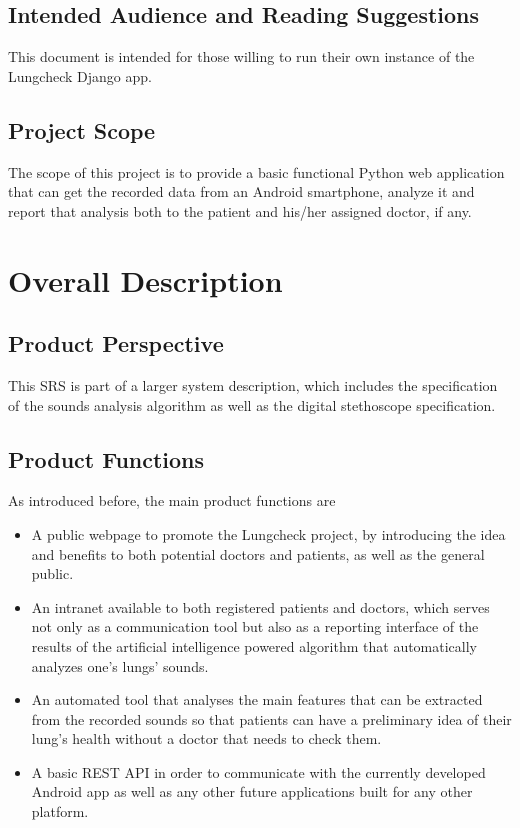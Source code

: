 \documentclass{scrreprt}
\begin{document}
\section{Intended Audience and Reading Suggestions}
This document is intended for those willing to run their own instance of the Lungcheck Django app.

\section{Project Scope}
The scope of this project is to provide a basic functional Python web application that can get the recorded data from an Android smartphone, analyze it and report that analysis both to the patient and his/her assigned doctor, if any.







\chapter{Overall Description}

\section{Product Perspective}
This SRS is part of a larger system description, which includes the specification of the sounds analysis algorithm as well as the digital stethoscope specification. 

\section{Product Functions}
As introduced before, the main product functions are
\begin{itemize}
 \item A public webpage to promote the Lungcheck project, by introducing the idea and benefits to both potential doctors and patients, as well as the general public.
 \item An intranet available to both registered patients and doctors, which serves not only as a communication tool but also as a reporting interface of the results of the artificial intelligence powered algorithm that automatically analyzes one's lungs' sounds.
 \item An automated tool that analyses the main features that can be extracted from the recorded sounds so that patients can have a preliminary idea of their lung's health without a doctor that needs to check them.
 \item A basic REST API in order to communicate with the currently developed Android app as well as any other future applications built for any other platform.
\end{itemize}
\end{document}
